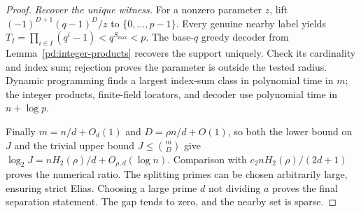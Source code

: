\begin{proof}
\emph{Recover the unique witness.}
For a nonzero parameter $z$, lift
$(-1)^{D+1}(q-1)^D/z$ to $\{0,\ldots,p-1\}$.
Every genuine nearby label yields
$T_I=\prod_{i\in I}(q^i-1)<q^{S_{\max}}<p$.
The base-$q$ greedy decoder from Lemma~\ref{pd:integer-products}
recovers the support uniquely. Check its cardinality and index sum;
rejection proves the parameter is outside the tested radius.
Dynamic programming finds a largest index-sum class in polynomial time
in $m$; the integer products, finite-field locators, and decoder use
polynomial time in $n+\log p$.

Finally $m=n/d+O_d(1)$ and $D=\rho n/d+O(1)$, so both the lower
bound on $J$ and the trivial upper bound $J\le\binom mD$ give
$\log_2J=nH_2(\rho)/d+O_{\rho,d}(\log n)$.
Comparison with $c_2nH_2(\rho)/(2d+1)$ proves the numerical ratio.
The splitting primes can be chosen arbitrarily large, ensuring strict
Elias. Choosing a large prime $d$ not dividing $a$ proves the final
separation statement. The gap tends to zero, and the nearby set is sparse.
\end{proof}

